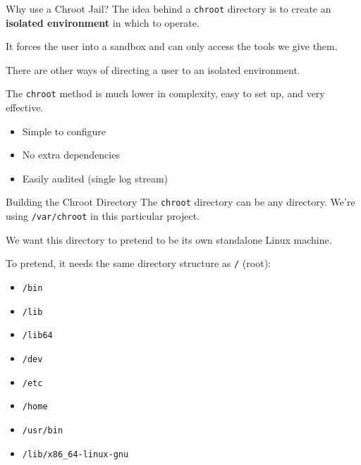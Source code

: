 \documentclass[14pt,compress,dvipsnames,aspectratio=169]{beamer} %
\begin{document}
\begin{frame}{Why use a Chroot Jail?}
    The idea behind a \texttt{chroot} directory is to create an \textbf{isolated
    environment} in which to operate.   

    It forces the user into a sandbox and can only access the tools we give them.  

    There are other ways of directing a user to an isolated environment.  

    The \texttt{chroot} method is much lower in complexity, easy to set up, and very effective.  
    \begin{itemize}
        \item Simple to configure
        \item No extra dependencies
        \item Easily audited (single log stream)
    \end{itemize}
\end{frame}





\begin{frame}{Building the Chroot Directory}
    The \texttt{chroot} directory can be any directory. We're using
    \texttt{/var/chroot} in this particular project.

    We want this directory to pretend to be its own standalone Linux machine.  

    To pretend, it needs the same directory structure as \texttt{/} (root):  
    \begin{itemize}
        \item{\texttt{/bin}} 
        \item{\texttt{/lib}} 
        \item{\texttt{/lib64}} 
        \item{\texttt{/dev}} 
        \item{\texttt{/etc}} 
        \item{\texttt{/home}} 
        \item{\texttt{/usr/bin}} 
        \item{\texttt{/lib/x86\_64-linux-gnu}} 
    \end{itemize}
\end{frame}
\end{document}
